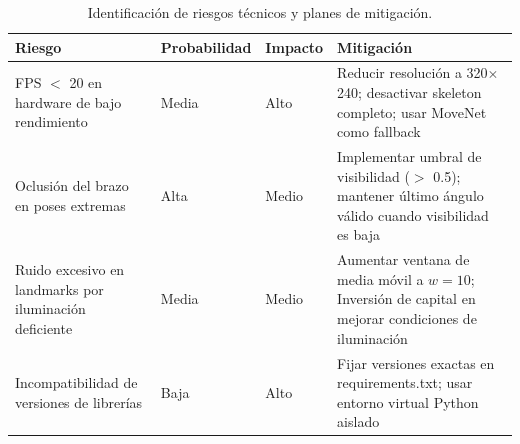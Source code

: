 \begin{table}[H]
\centering
\label{tab:riesgos}
\renewcommand{\arraystretch}{1.3}
\begin{tabularx}{\textwidth}{
    X
    p{2cm}
    p{1.8cm}
    X
}
\toprule
\textbf{Riesgo} &
\textbf{Probabilidad} &
\textbf{Impacto} &
\textbf{Mitigación} \\
\midrule
FPS $<$ 20 en hardware de bajo rendimiento &
  Media & Alto &
  Reducir resolución a 320$\times$240; desactivar skeleton completo;
  usar MoveNet como fallback \\
\midrule
Oclusión del brazo en poses extremas &
  Alta & Medio &
  Implementar umbral de visibilidad ($>$ 0.5); mantener último ángulo
  válido cuando visibilidad es baja \\
\midrule
Ruido excesivo en landmarks por iluminación deficiente &
  Media & Medio &
  Aumentar ventana de media móvil a $w = 10$; Inversión de capital en mejorar condiciones de iluminación \\
\midrule
Incompatibilidad de versiones de librerías &
  Baja & Alto &
  Fijar versiones exactas en requirements.txt; usar entorno
  virtual Python aislado \\
\bottomrule
\end{tabularx}
\caption{Identificación de riesgos técnicos y planes de mitigación.}
\end{table}

